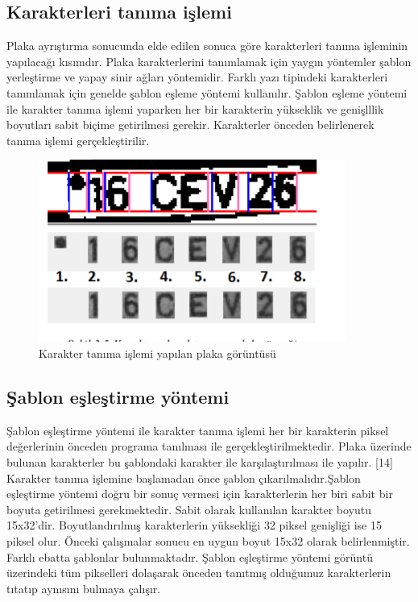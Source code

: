 \subsection{Karakterleri tanıma işlemi}
\cite{image_proc} Plaka ayrıştırma sonucunda elde edilen sonuca göre karakterleri tanıma işleminin yapılacağı kısımdır. Plaka karakterlerini tanımlamak için yaygın yöntemler şablon yerleştirme ve yapay sinir ağları yöntemidir. Farklı yazı tipindeki karakterleri tanımlamak için genelde şablon eşleme yöntemi kullanılır. Şablon eşleme yöntemi ile karakter tanıma işlemi yaparken her bir karakterin yükseklik ve genişlllik boyutları sabit biçime getirilmesi gerekir. Karakterler önceden belirlenerek tanıma işlemi gerçekleştirilir.
\begin{figure}
    \centering
    \includegraphics{karakter tanındı.PNG}
    \caption{Karakter tanıma işlemi yapılan plaka görüntüsü}
    \label{fig:my_label}
\end{figure}
\subsection{ Şablon eşleştirme yöntemi}
\cite{imagep} Şablon eşleştirme yöntemi ile karakter tanıma işlemi her bir karakterin piksel değerlerinin önceden programa tanılması ile gerçekleştirilmektedir. Plaka üzerinde bulunan karakterler bu şablondaki karakter ile karşılaştırılması ile yapılır. [14] Karakter tanıma işlemine başlamadan önce şablon çıkarılmalıdır.Şablon eşleştirme yöntemi doğru bir sonuç vermesi için karakterlerin her biri sabit bir boyuta getirilmesi gerekmektedir. Sabit olarak kullanılan karakter boyutu 15x32'dir. Boyutlandırılmış karakterlerin yüksekliği 32 piksel genişliği ise 15 piksel olur. Önceki çalışmalar sonucu en uygun boyut 15x32 olarak belirlenmiştir. Farklı ebatta şablonlar bulunmaktadır. Şablon eşleştirme yöntemi görüntü üzerindeki tüm pikselleri dolaşarak önceden tanıtmış olduğumuz karakterlerin tıtatıp aynısını bulmaya çalışır.
